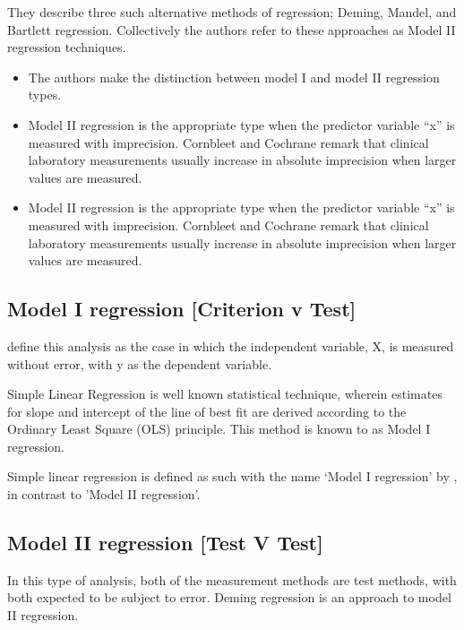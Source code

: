 \documentclass[12pt, a4paper]{report}
\theoremstyle{plain}
\theoremstyle{definition}
\theoremstyle{remark}
\begin{document}
They describe three such alternative methods of regression; Deming, Mandel, and Bartlett regression. Collectively the authors refer to these approaches as Model II regression techniques.

\begin{itemize}
	\item The authors make the distinction between model I and model II regression types.
	\item Model II regression is the appropriate type when the predictor variable “x” is measured with imprecision.
	Cornbleet and Cochrane remark that clinical laboratory measurements usually increase in absolute imprecision when larger values are measured. %
\end{itemize}

\begin{itemize}
	\item Model II regression is the appropriate type when the predictor variable “x” is measured with imprecision.
	Cornbleet and Cochrane remark that clinical laboratory measurements usually increase in absolute imprecision when larger values are measured. %
\end{itemize}
\subsection{Model I regression [Criterion v Test]}
\citet{CornCoch} define this analysis as the case in which the independent variable, X, is measured without error, with y as the dependent variable.
 
 

Simple Linear Regression is well known statistical technique, wherein estimates for slope and
intercept of the line of best fit are derived according to the Ordinary Least Square (OLS) principle. This method is known to \citet{CornCoch} as Model I regression.

Simple linear regression is defined as such with the name `Model I regression' by \citet{CornCoch}, in contrast to 'Model II regression'.

 
\subsection{Model II regression [Test V Test]}
In this type of analysis, both of the measurement methods are test methods, with both expected to be subject to error. Deming regression is an approach to model II regression.
\end{document}
